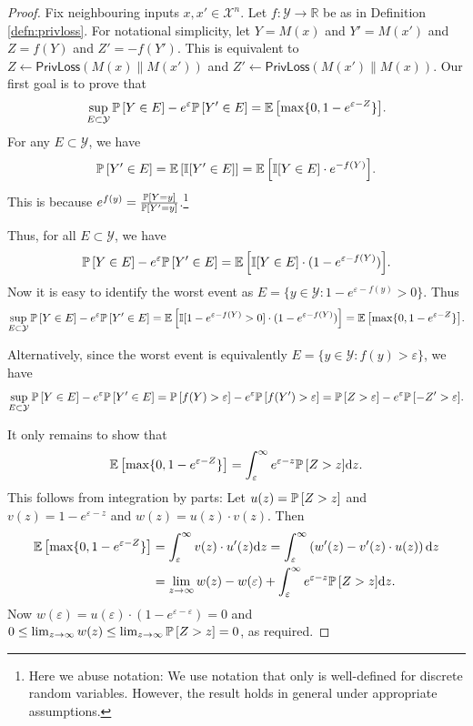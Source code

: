 \documentclass{jpcfinal} %
\newcommand{\ex}[2]{{\ifx&#1& \mathbb{E} \else
\underset{#1}{\mathbb{E}} \fi \left[#2\right]}}
\newcommand{\pr}[2]{{\ifx&#1& \mathbb{P} \else
\underset{#1}{\mathbb{P}} \fi \left[#2\right]}}
\newcommand{\eps}{\varepsilon}
\newcommand{\privloss}[2]{\mathsf{PrivLoss}\left(#1\middle\|#2\right)}
\newcommand{\dx}[1][x]{\mathrm{d}#1}
\newcommand{\R}{\mathbb{R}}
\begin{document}
\begin{proof}
Fix neighbouring inputs $x,x'\in\mathcal{X}^n$. 
Let $f\colon \mathcal{Y} \to \R$ be as in Definition \ref{defn:privloss}.
For notational simplicity, let $Y=M(x)$ and $Y'=M(x')$ and $Z=f(Y)$ and $Z'=-f(Y')$. This is equivalent to $Z \gets \privloss{M(x)}{M(x')}$ and $Z' \gets \privloss{M(x')}{M(x)}$.
Our first goal is to prove that
$$\sup_{E \subset \mathcal{Y}} \pr{}{Y \in E} - e^\eps \pr{}{Y' \in E} = \ex{}{\max\{0,1-e^{\eps-Z}\}}.
$$
For any $E \subset \mathcal{Y}$, we have $$\pr{}{Y' \in E} = \ex{}{\mathbb{I}[Y' \in E]} = \ex{}{\mathbb{I}[Y \in E]\cdot e^{-f(Y)}}.$$ This is because $e^{f(y)} = \frac{\pr{}{Y=y}}{\pr{}{Y'=y}}$.\footnote{Here we abuse notation: We use notation that only is well-defined for discrete random variables. However, the result holds in general under appropriate assumptions.}

Thus, for all $E \subset \mathcal{Y}$, we have $$\pr{}{Y \in E} - e^\eps \pr{}{Y' \in E} = \ex{}{\mathbb{I}[Y \in E] \cdot (1 - e^{\eps-f(Y)})}.$$ Now it is easy to identify the worst event as $E = \{y \in \mathcal{Y} : 1-e^{\eps-f(y)}>0\}$. Thus $$\sup_{E \subset \mathcal{Y}} \pr{}{Y \in E} - e^\eps \pr{}{Y' \in E} = \ex{}{\mathbb{I}[1-e^{\eps-f(Y)}>0] \cdot (1 - e^{\eps-f(Y)})} = \ex{}{\max\{0,1-e^{\eps-Z}\}}.$$

\noindent Alternatively, since the worst event is equivalently $E = \{ y \in \mathcal{Y} : f(y) > \eps \}$, we have $$\sup_{E \subset \mathcal{Y}} \pr{}{Y \in E} - e^\eps \pr{}{Y' \in E} = \pr{}{f(Y)>\eps} - e^\eps \pr{}{f(Y')>\eps} = \pr{}{Z>\eps}-e^\eps \pr{}{-Z'>\eps}.$$

\noindent It only remains to show that $$\ex{}{\max\{0,1-e^{\eps-Z}\}} = \int_\eps^\infty e^{\eps-z} \pr{}{Z>z} \dx[z].$$
This follows from integration by parts: Let $u(z) = \pr{}{Z>z}$ and $v(z) = 1-e^{\eps-z}$ and $w(z)=u(z) \cdot v(z)$. Then 
\begin{align*}
    \ex{}{\max\{0,1-e^{\eps-Z}\}} &= \int_\eps^\infty v(z) \cdot u'(z) \dx[z] = \int_\eps^\infty \left( w'(z) - v'(z) \cdot u(z) \right) \dx[z]\\
    &= \lim_{z \to \infty} w(z) - w(\eps) + \int_\eps^\infty e^{\eps-z} \pr{}{Z>z} \dx[z].
\end{align*}
Now $w(\eps) = u(\eps) \cdot (1-e^{\eps-\eps}) = 0$ and $0 \le \lim_{z \to \infty} w(z) \le \lim_{z \to \infty} \pr{}{Z>z} = 0$, as required.
\end{proof}
\end{document}
